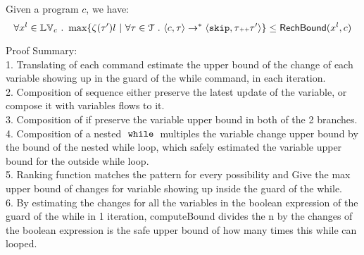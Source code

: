   {
  \begin{lem}
    \label{lem:reachability_soundness}
  Given a program ${c}$, we have:
  \[
  \forall x^l \in \lvar_c \st 
  \max \left\{ \vcounter(\vtrace') l ~ \middle\vert~
  \forall \vtrace \in \mathcal{T} \st \config{{c}, \trace} \to^{*} \config{\eskip, \trace\tracecat\vtrace'} \right\} 
  \leq 
  \rb(x^l, c)
  \]
  \end{lem}
}
Proof Summary:
\\
1. Translating of each command estimate the upper bound of the change of each variable showing up in the guard of the while command, in each iteration.
\\
2. Composition of sequence either preserve the latest update of the variable, or compose it with variables flows to it.
\\
3. Composition of if preserve the variable upper bound in both of the 2 branches.
\\
4. Composition of a nested $\;\mathtt{while}\;$ multiples the variable change upper bound by the bound of the nested while loop, which safely estimated the variable upper bound for the outside while loop.
\\
5. Ranking function matches the pattern for every possibility and Give the max upper bound of changes for variable showing up inside the guard of the while.
\\
6. By estimating the changes for all the variables in the boolean expression of the guard of the while in 1 iteration, computeBound divides the n by the changes of the boolean expression is the safe upper bound of how many times this while can looped. 
